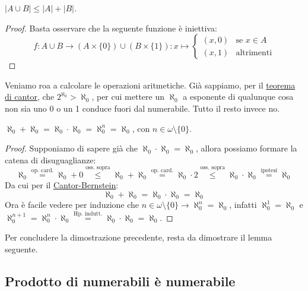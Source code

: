 \documentclass[11pt]{scrartcl}
\begin{document}
\begin{remark}
	$|A \cup B| \leq |A| + |B|$.
\end{remark}

\begin{proof}
	Basta osservare che la seguente funzione è iniettiva:
	\[ f : A \cup B \longrightarrow (A \times \{0\}) \cup (B \times \{1\}) : x \longmapsto \begin{cases}
		(x,0) &\text{se $x \in A$} \\
		(x,1) &\text{altrimenti}
	\end{cases}
		\]
\end{proof}

Veniamo roa a calcolare le operazioni aritmetiche. Già sappiamo, per il \hyperref[cantor]{teorema di cantor}, 
che $2^{\aleph_0} > \aleph_0$, per cui mettere un $\aleph_0$ a esponente di qualunque cosa non sia uno 0 o un 1 conduce fuori dal numerabile.
Tutto il resto invece no.

\begin{proposition}
	$\aleph_0 + \aleph_0 = \aleph_0 \cdot \aleph_0 = \aleph_0^{n} = \aleph_0$, con $n \in \omega\setminus\{0\}$.
\end{proposition}

\begin{proof}
	Supponiamo di sapere già che $\aleph_0 \cdot \aleph_0 = \aleph_0$, allora possiamo formare la catena di disuguaglianze:
	\[ \aleph_0 \overset{\text{op. card.}}{=} \aleph_0 + 0 \overset{\text{oss. sopra}}{\leq} \aleph_0 + \aleph_0 \overset{\text{op. card.}}{=} \aleph_0 \cdot 2 \overset{\text{oss. sopra}}{\leq} \aleph_0 \cdot \aleph_0 \overset{\text{ipotesi}}{=} \aleph_0
		\]
	Da cui per il \hyperref[CB]{Cantor-Bernstein}:
	\[ \aleph_0 + \aleph_0 = \aleph_0 \cdot \aleph_0 = \aleph_0
		\]
	Ora è facile vedere per induzione che $n \in \omega \setminus\{0\} \rightarrow \aleph_0^n = \aleph_0 $, infatti $\aleph_0^1 = \aleph_0$ e $\aleph_0^{n+1} = \aleph_0^n \cdot \aleph_0 \overset{\text{Hp. indutt.}}{=} \aleph_0 \cdot \aleph_ 0 = \aleph_0$.
\end{proof}

Per concludere la dimostrazione precedente, resta da dimostrare il lemma seguente.

\subsection{Prodotto di numerabili è numerabile}
\end{document}

